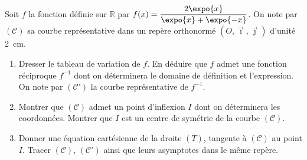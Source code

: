 \begin{exo}
\label{exo:el sigmoide}
Soit $f$ la fonction d\'efinie sur $\mathbb{R}$ par
$\displaystyle{f(x) = \frac{ 2 \expo{x} }{ \expo{x} + \expo{-x} } }$.
On note par $(\mathscr{C})$ sa courbe repr\'esentative
dans un rep\`ere orthonorm\'e $(O,\vec{\imath},\vec{\jmath})$ d'unit\'e 2~cm.
\begin{enumerate}
      \item Dresser le tableau de variation de $f$.
            En d\'eduire que $f$ admet une fonction r\'eciproque $f^{-1}$ dont on d\'eterminera le domaine de d\'efinition
            et l'expression.
            On note par $(\mathscr{C}')$ la courbe repr\'esentative de $f^{-1}$.
      \item Montrer que $(\mathscr{C})$ admet un point d'inflexion $I$ dont on d\'eterminera les coordonn\'ees.
            Montrer que $I$ est un centre de sym\'etrie de la courbe $(\mathscr{C})$.
      \item Donner une \'equation cart\'esienne de la droite $(T)$, tangente \`a $(\mathscr{C})$ au point $I$.
            Tracer $(\mathscr{C})$, $(\mathscr{C}')$ ainsi que leurs asymptotes dans le m\^eme rep\`ere.
\end{enumerate}
\end{exo}

